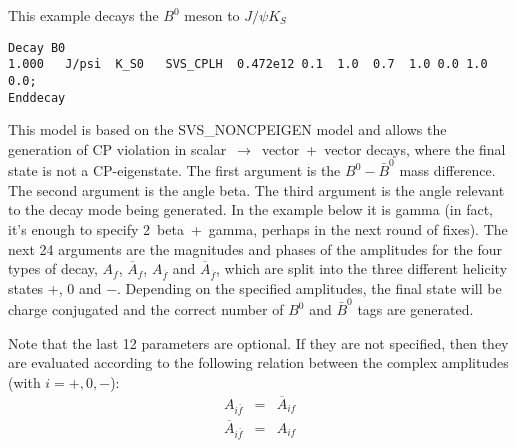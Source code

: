 \Example
This example decays the $B^0$ meson to $J/\psi K_S$
\begin{verbatim}
Decay B0
1.000   J/psi  K_S0   SVS_CPLH  0.472e12 0.1  1.0  0.7  1.0 0.0 1.0 0.0;
Enddecay
\end{verbatim}





\label{svvnoncpeigen}



\Expl
This model is based on the SVS\_NONCPEIGEN model and allows the
generation of CP violation in scalar~$\rightarrow$~vector~+~vector
decays, where the final state is not a CP-eigenstate.  The first
argument is the $B^0-\bar B^0$ mass difference. The second argument
is the angle beta.  The third argument is the angle relevant to the
decay mode being generated.  In the example below it is gamma (in
fact, it's enough to specify 2~beta~+~gamma, perhaps in the next
round of fixes).  The next 24 arguments are the magnitudes and phases
of the amplitudes for the four types of decay, $A_f$, $\overline
A_f$, $A_{\overline f}$ and $\overline A_{\overline f}$, which are
split into the three different helicity states +, 0 and $-$.
Depending on the specified amplitudes, the final state will be charge
conjugated and the correct number of $B^0$ and $\bar B^0$ tags are
generated.

Note that the last 12 parameters are optional. If they are not
specified, then they are evaluated according to the following relation
between the complex amplitudes (with $i=+,0,-$):
\begin{eqnarray}
          A_{i \overline f} &=& \overline A_{if} \nonumber\\
\overline A_{i \overline f} &=&           A_{if}  
\label{eq:svv_noncpeigen}
\end{eqnarray}


